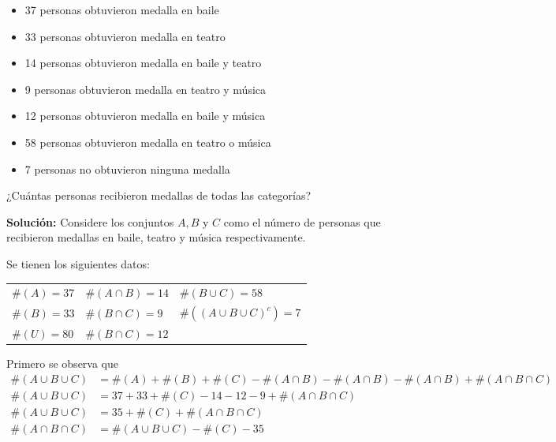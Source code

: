 \documentclass[a4paper,10pt]{article}
\begin{document}
                    \begin{itemize}
                      \item 37 personas obtuvieron medalla en baile
                      \item 33 personas obtuvieron medalla en teatro
                      \item 14 personas obtuvieron medalla en baile y teatro
                      \item 9  personas obtuvieron medalla en teatro y música
                      \item 12 personas obtuvieron medalla en baile y música
                      \item 58 personas obtuvieron medalla en teatro o música
                      \item 7 personas no obtuvieron ninguna medalla
                    \end{itemize}

¿Cuántas personas recibieron medallas de todas las categorías?
 \vspace{3mm}

\textbf{Solución:}
    Considere los conjuntos $A,B$ y $C$ como el número de personas que recibieron medallas en baile, teatro y música respectivamente.

    Se tienen los siguientes datos:

    \begin{center}
    \begin{tabular}{lll}
        $\#(A) = 37 $ & $\#(A \cap B) = 14$ & $\#(B \cup C) = 58$ \\
        $\#(B)= 33$   & $\#(B \cap C) = 9 $ & $\#\left( (A \cup B \cup C)^c \right)= 7$ \\
        $\#(U)=80$    & $\#(B \cap C) = 12$ &  \\
    \end{tabular}
    \end{center}

    Primero se observa que
        \begin{align*}
            \#(A \cup B \cup C) &= \#(A) + \#(B) + \#(C) - \#(A \cap B) - \#(A \cap B) - \#(A \cap B) + \#(A \cap B \cap C) \\
            \#(A \cup B \cup C) &= 37 + 33 + \#(C) - 14 - 12 - 9 + \#(A \cap B \cap C) \\
            \#(A \cup B \cup C) &= 35 +  \#(C) + \#(A \cap B \cap C) \\
            \#(A \cap B \cap C) &= \#(A \cup B \cup C) - \#(C)- 35
        \end{align*}
\end{document}
